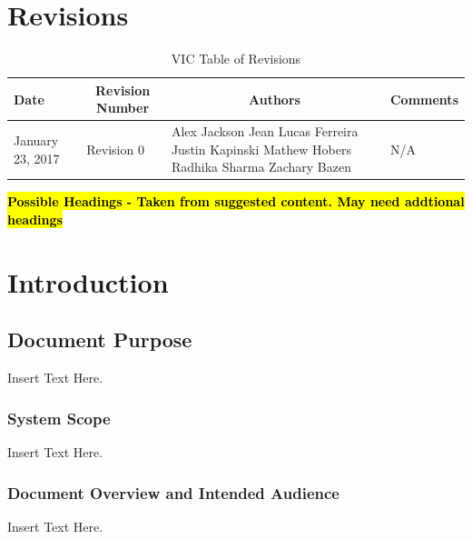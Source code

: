 \documentclass [10pt]{article}
\begin{document}
\section{Revisions}
\begin{longtable}{| p{ } | p{ } | p{ } | p{ } |} \caption{VIC Table of Revisions}  \\

\hline 
\centering \textbf{Date} & 
\multicolumn{1}{c}{\textbf {Revision Number}} &
\multicolumn{1}{|c}{\textbf {Authors}} & 
\multicolumn{1}{|c|}{\textbf {Comments}} \\ \hline

\multirow{4}{*}{\centering January 23, 2017}  & 
\multirow{4}{*}{Revision 0}& 
{Alex Jackson \newline
Jean Lucas Ferreira \newline
Justin Kapinski\newline
Mathew Hobers\newline
Radhika Sharma\newline
Zachary Bazen}
&
 \multirow{4}{*}{N/A} \\ 
\hline 


\end{longtable}
\pagebreak


\begin{center}
\textbf{\Large \hl{Possible Headings - Taken from suggested content. May need addtional headings}}
\end{center}

\section {Introduction}


\subsection{Document Purpose}
Insert Text Here. 

\subsubsection{System Scope}
Insert Text Here. 

\subsubsection{Document Overview and Intended Audience}
Insert Text Here. 
\end{document}
